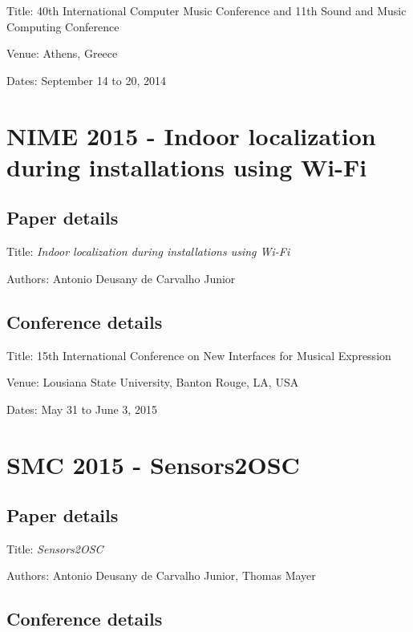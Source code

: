 Title: 40th International Computer Music Conference and 11th Sound and Music Computing Conference

Venue: Athens, Greece

Dates: September 14 to 20, 2014 



\section{NIME 2015 - Indoor localization during installations using Wi-Fi}
\label{ape:papernime2015}

\subsection*{Paper details}

Title: \textit{Indoor localization during installations using Wi-Fi}

Authors: Antonio Deusany de Carvalho Junior

\subsection*{Conference details}

Title: 15th International Conference on New Interfaces for Musical Expression

Venue: Lousiana State University, Banton Rouge, LA, USA

Dates: May 31 to June 3, 2015



\section{SMC 2015 - Sensors2OSC}
\label{ape:papersmc2015}

\subsection*{Paper details}

Title: \textit{Sensors2OSC}

Authors: Antonio Deusany de Carvalho Junior, Thomas Mayer

\subsection*{Conference details}


